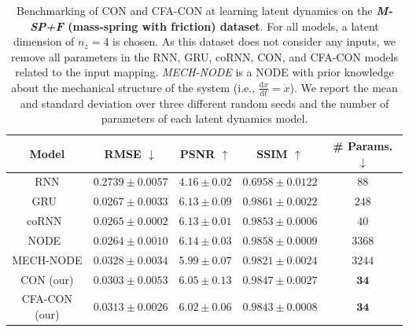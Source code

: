 \begin{table}[ht]
    \centering
    \begin{scriptsize}
    \begin{tabular}{c c c c c}
         \toprule
         \textbf{Model} & \textbf{RMSE} $\downarrow$ & \textbf{PSNR} $\uparrow$ & \textbf{SSIM} $\uparrow$ & \textbf{\# Params.} $\downarrow$ \\
         \midrule
         RNN & $0.2739 \pm 0.0057$ & $4.16 \pm 0.02$ & $0.6958 \pm 0.0122$ & $88$\\
         GRU~\citep{cho2014learning} & $0.0267 \pm 0.0033$ & $\mathbf{6.13 \pm 0.09}$ & $0.9861 \pm 0.0022$ & $248$\\
         coRNN~\citep{rusch2020coupled} & $\mathbf{0.0265 \pm 0.0002}$ & $\mathbf{6.13 \pm 0.01}$ & $\mathbf{0.9853 \pm 0.0006}$ & $40$\\
         NODE~\citep{chen2018neural} & $\mathbf{0.0264 \pm 0.0010}$ & $\mathbf{6.14 \pm 0.03}$ & $\mathbf{0.9858 \pm 0.0009}$ & $3368$\\
         MECH-NODE & $0.0328 \pm 0.0034$ & $5.99 \pm 0.07$ & $0.9821 \pm 0.0024$ & $3244$\\
         CON (our) & $0.0303 \pm 0.0053$ & $6.05 \pm 0.13$ & $0.9847 \pm 0.0027$ & $\mathbf{34}$\\
         CFA-CON (our) & $0.0313 \pm 0.0026$ & $6.02 \pm 0.06$ & $0.9843 \pm 0.0008$ & $\mathbf{34}$\\
         \bottomrule
    \end{tabular}
    \end{scriptsize}
    \vspace{0.5cm}
    \caption{Benchmarking of \gls{CON} and \gls{CFA-CON} at learning latent dynamics on the \textbf{\emph{M-SP+F} (mass-spring with friction) dataset}. For all models, a latent dimension of $n_z=4$ is chosen.
    As this dataset does not consider any inputs, we remove all parameters in the RNN, GRU, coRNN, CON, and CFA-CON models related to the input mapping.
    \emph{MECH-NODE} is a \gls{NODE} with prior knowledge about the mechanical structure of the system (i.e., $\frac{\mathrm{d}x}{\mathrm{d}t} = \dot{x}$). We report the mean and standard deviation over three different random seeds and the number of parameters of each latent dynamics model.
    }
    \label{tab:apx-con:latent_dynamics_results:m_sp_f}
\end{table}

